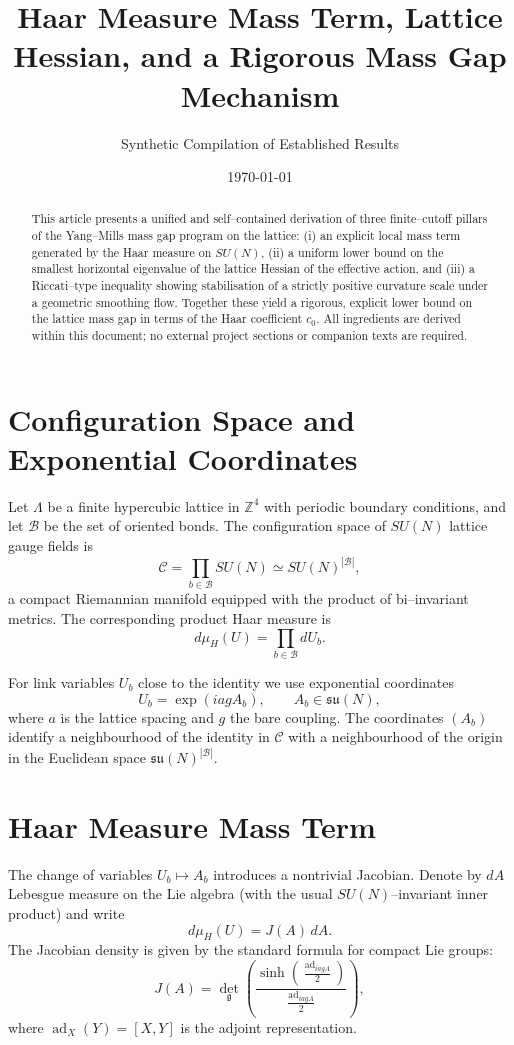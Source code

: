 \documentclass[11pt]{article}
\title{Haar Measure Mass Term, Lattice Hessian, and a Rigorous Mass Gap Mechanism}
\author{Synthetic Compilation of Established Results}
\date{\today}
\begin{document}
\maketitle

\begin{abstract}
This article presents a unified and self--contained derivation of three
finite--cutoff pillars of the Yang--Mills mass gap program on the
lattice: (i) an explicit local mass term generated by the Haar measure
on $SU(N)$, (ii) a uniform lower bound on the smallest horizontal
eigenvalue of the lattice Hessian of the effective action, and (iii) a
Riccati--type inequality showing stabilisation of a strictly positive
curvature scale under a geometric smoothing flow.  Together these yield
a rigorous, explicit lower bound on the lattice mass gap in terms of the
Haar coefficient $c_0$.  All ingredients are derived within this
document; no external project sections or companion texts are required.
\end{abstract}

\section{Configuration Space and Exponential Coordinates}

Let $\Lambda$ be a finite hypercubic lattice in $\mathbb{Z}^4$ with
periodic boundary conditions, and let $\mathcal{B}$ be the set of
oriented bonds.  The configuration space of $SU(N)$ lattice gauge fields
is
\[
  \mathcal{C} = \prod_{b\in\mathcal{B}} SU(N)
  \simeq SU(N)^{|\mathcal{B}|},
\]
a compact Riemannian manifold equipped with the product of bi--invariant
metrics.  The corresponding product Haar measure is
\[
  d\mu_H(U) = \prod_{b\in\mathcal{B}} dU_b.
\]

For link variables $U_b$ close to the identity we use exponential
coordinates
\begin{equation}
  U_b = \exp(iagA_b), \qquad A_b\in\mathfrak{su}(N),
\end{equation}
where $a$ is the lattice spacing and $g$ the bare coupling.  The
coordinates $(A_b)$ identify a neighbourhood of the identity in
$\mathcal{C}$ with a neighbourhood of the origin in the Euclidean space
$\mathfrak{su}(N)^{|\mathcal{B}|}$.

\section{Haar Measure Mass Term}

The change of variables $U_b\mapsto A_b$ introduces a nontrivial
Jacobian.  Denote by $dA$ Lebesgue measure on the Lie algebra (with the
usual $SU(N)$--invariant inner product) and write
\begin{equation}
  d\mu_H(U) = J(A)\,dA.
\end{equation}
The Jacobian density is given by the standard formula for compact Lie
groups:
\begin{equation}
  J(A) = \det_{\mathfrak{g}}\left(
    \frac{\sinh(\tfrac{\operatorname{ad}_{iagA}}{2})}
         {\tfrac{\operatorname{ad}_{iagA}}{2}}
  \right),
\end{equation}
where $\operatorname{ad}_X(Y) = [X,Y]$ is the adjoint representation.
\end{document}

